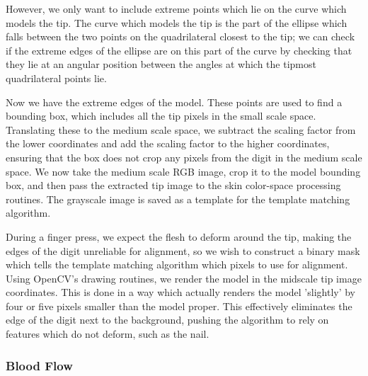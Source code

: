 However, we only want to include extreme points which lie on the curve which models the tip. The curve which models the tip is the part of the ellipse which falls between the two points on the quadrilateral closest to the tip; we can check if the extreme edges of the ellipse are on this part of the curve by checking that they lie at an angular position between the angles at which the tipmost quadrilateral points lie.

Now we have the extreme edges of the model. These points are used to find a bounding box, which includes all the tip pixels in the small scale space. Translating these to the medium scale space, we subtract the scaling factor from the lower coordinates and add the scaling factor to the higher coordinates, ensuring that the box does not crop any pixels from the digit in the medium scale space. We now take the medium scale RGB image, crop it to the model bounding box, and then pass the extracted tip image to the skin color-space processing routines. The grayscale image is saved as a template for the template matching algorithm.

During a finger press, we expect the flesh to deform around the tip, making the edges of the digit unreliable for alignment, so we wish to construct a binary mask which tells the template matching algorithm which pixels to use for alignment. Using OpenCV's drawing routines, we render the model in the midscale tip image coordinates. This is done in a way which actually renders the model 'slightly' by four or five pixels smaller than the model proper. This effectively eliminates the edge of the digit next to the background, pushing the algorithm to rely on features which do not deform, such as the nail.

\subsubsection{Blood Flow}\label{sec:BloodFlow}

